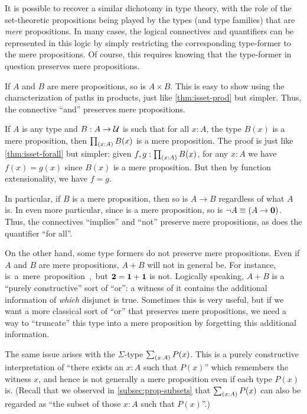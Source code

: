 It is possible to recover a similar dichotomy in type theory, with the role of the set-theoretic propositions being played by the types (and type families) that are \emph{mere} propositions.
In many cases, the logical connectives and quantifiers can be represented in this logic by simply restricting the corresponding type-former to the mere propositions.
Of course, this requires knowing that the type-former in question preserves mere propositions.

\begin{eg}
  If $A$ and $B$ are mere propositions, so is $A\times B$.
  This is easy to show using the characterization of paths in products, just like \autoref{thm:isset-prod} but simpler.
  Thus, the connective ``and'' preserves mere propositions.
\end{eg}

\begin{eg}\label{thm:isprop-forall}
  If $A$ is any type and $B:A\to \mathcal{U}$ is such that for all $x:A$, the type $B(x)$ is a mere proposition, then $\prd{x:A} B(x)$ is a mere proposition.
  The proof is just like \autoref{thm:isset-forall} but simpler: given $f,g:\prd{x:A} B(x)$, for any $x:A$ we have $f(x)=g(x)$ since $B(x)$ is a mere proposition.
  But then by function extensionality, we have $f=g$.

  In particular, if $B$ is a mere proposition, then so is $A\to B$ regardless of what $A$ is.
  In even more particular, since \emptyt is a mere proposition, so is $\neg A \equiv (A\to\mathbf{0})$.
  Thus, the connectives ``implies'' and ``not'' preserve mere propositions, as does the quantifier ``for all''.
\end{eg}

On the other hand, some type formers do not preserve mere propositions.
Even if $A$ and $B$ are mere propositions, $A+B$ will not in general be.
For instance, \unit is a mere proposition, but $\mathbf{2}=\mathbf{1}+\mathbf{1}$ is not.
Logically speaking, $A+B$ is a ``purely constructive'' sort of ``or'': a witness of it contains the additional information of \emph{which} disjunct is true.
Sometimes this is very useful, but if we want a more classical sort of ``or'' that preserves mere propositions, we need a way to ``truncate'' this type into a mere proposition by forgetting this additional information.

%
The same issue arises with the $\Sigma$-type $\sm{x:A} P(x)$.
This is a purely constructive interpretation of ``there exists an $x:A$ such that $P(x)$'' which remembers the witness $x$, and hence is not generally a mere proposition even if each type $P(x)$ is.
(Recall that we observed in \autoref{subsec:prop-subsets} that $\sm{x:A} P(x)$ can also be regarded as ``the subset of those $x:A$ such that $P(x)$''.)


